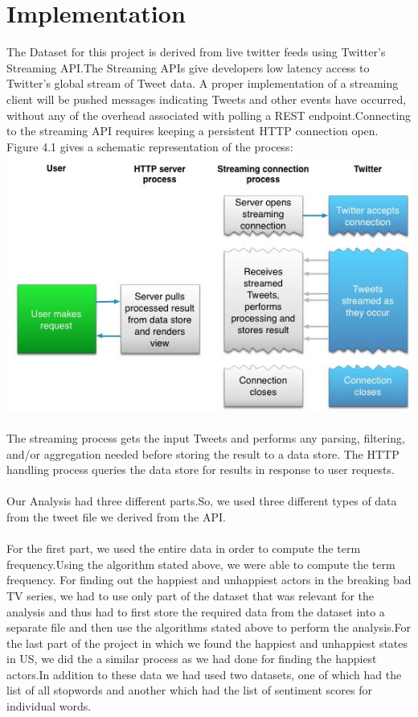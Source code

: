 \documentclass[11pt,english]{article}
\begin{document}
\section{Implementation}
The Dataset for this project is derived from live twitter feeds using Twitter's Streaming API.The Streaming APIs give developers low latency access to Twitter’s global stream of Tweet data. A proper implementation of a streaming client will be pushed messages indicating Tweets and other events have occurred, without any of the overhead associated with polling a REST endpoint.Connecting to the streaming API requires keeping a persistent HTTP connection open.\\
Figure 4.1 gives a schematic representation of the process:\\
\includegraphics{fig4-2.jpg}\\ \\
The streaming process gets the input Tweets and performs any parsing, filtering, and/or aggregation needed before storing the result to a data store. The HTTP handling process queries the data store for results in response to user requests.\\ \\
Our Analysis had three different parts.So, we used three different types of data from the tweet file we derived from the API.\\ \\
For the first part, we used the entire data in order to compute the term frequency.Using the algorithm stated above, we were able to compute the term frequency. For finding out the happiest and unhappiest actors in the breaking bad TV series, we had to use only part of the dataset that was relevant for the analysis and thus had to first store the required data from the dataset into a separate file and then use the algorithms stated above to perform the analysis.For the last part of the project in which we found the happiest and unhappiest states in US, we did the a similar process as we had done for finding the happiest actors.In addition to these data we had used two datasets, one of which had the list of all stopwords and another which had the list of sentiment scores for individual words.
\end{document}
